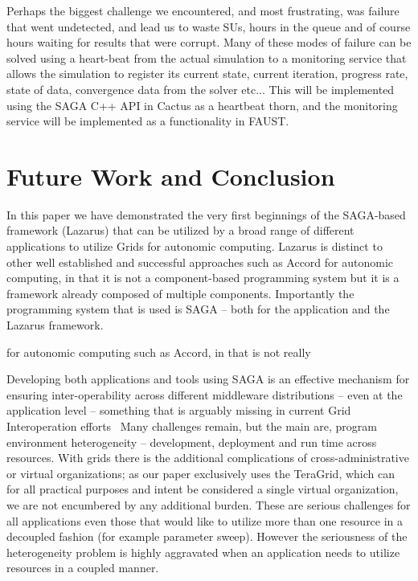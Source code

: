 \documentclass[conference,final]{IEEEtran}
\begin{document}
Perhaps the biggest challenge we encountered, and most frustrating, was failure
that went undetected, and lead us to waste SUs, hours in the queue and of course
hours waiting for results that were corrupt. Many of these modes of failure
can be solved using a heart-beat from the actual simulation to a monitoring service
that allows the simulation to register its current state, current iteration, progress rate,
state of data, convergence data from the solver etc... This will be implemented
using the SAGA C++ API in Cactus as a heartbeat thorn, and the monitoring service
will be implemented as a functionality in FAUST.

\section{Future Work and Conclusion}

In this paper we have demonstrated the very first beginnings of the
SAGA-based framework (Lazarus) that can be utilized by a broad range
of different applications to utilize Grids for autonomic computing.
Lazarus is distinct to other well established and successful
approaches such as Accord for autonomic computing, in that it is not a
component-based programming system but it is a framework already
composed of multiple components. Importantly the programming system
that is used is SAGA -- both for the application and the Lazarus
framework.

for autonomic computing such as Accord, in that is not really 



Developing both applications and tools using SAGA is an effective
mechanism for ensuring inter-operability across different middleware
distributions -- even at the application level -- something that is
arguably missing in current Grid Interoperation
efforts~\cite{gin_paper} Many challenges remain, but the main are,
program environment heterogeneity -- development, deployment and run
time across resources.  With grids there is the additional
complications of cross-administrative or virtual organizations; as our
paper exclusively uses the TeraGrid, which can for all practical
purposes and intent be considered a single virtual organization, we
are not encumbered by any additional burden. These are serious
challenges for all applications even those that would like to utilize
more than one resource in a decoupled fashion (for example parameter
sweep).  However the seriousness of the heterogeneity problem is
highly aggravated when an application needs to utilize resources in a
coupled manner.
\end{document}
